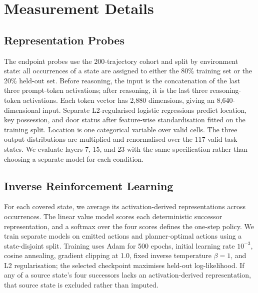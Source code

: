 \documentclass{article}
\begin{document}








\appendix

\section{Measurement Details}

\subsection{Representation Probes}\label{app:representation-probes}
The endpoint probes use the 200-trajectory cohort and split by environment state: all occurrences of a state are assigned to either the 80\% training set or the 20\% held-out set. Before reasoning, the input is the concatenation of the last three prompt-token activations; after reasoning, it is the last three reasoning-token activations. Each token vector has 2,880 dimensions, giving an 8,640-dimensional input. Separate L2-regularised logistic regressions predict location, key possession, and door status after feature-wise standardisation fitted on the training split. Location is one categorical variable over valid cells. The three output distributions are multiplied and renormalised over the 117 valid task states. We evaluate layers 7, 15, and 23 with the same specification rather than choosing a separate model for each condition.

\subsection{Inverse Reinforcement Learning}\label{app:irl-details}
For each covered state, we average its activation-derived representations across occurrences. The linear value model scores each deterministic successor representation, and a softmax over the four scores defines the one-step policy. We train separate models on emitted actions and planner-optimal actions using a state-disjoint split. Training uses Adam for 500 epochs, initial learning rate $10^{-3}$, cosine annealing, gradient clipping at 1.0, fixed inverse temperature $\beta=1$, and L2 regularisation; the selected checkpoint maximises held-out log-likelihood. If any of a source state's four successors lacks an activation-derived representation, that source state is excluded rather than imputed.
\end{document}
